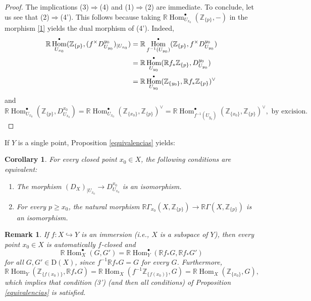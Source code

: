 \documentclass[amssymb,amscd,11pt,20pt]{amsart}
\newcommand{\ZZ}{{\mathbb Z}}
\newcommand{\RR}{\mathbb R}
\newcommand{\0}{\mathbf 0}
\DeclareMathOperator{\Hom}{{Hom}}
\newcommand{\pun}{{\scriptscriptstyle \bullet}}
\theoremstyle{plain}
\newtheorem{cor}[thm]{Corollary}
\newtheorem{rem}[thm]{Remark}
\numberwithin{equation}{thm}
\begin{document}
\begin{proof}

The implications (3)$\Rightarrow$(4) and (1)$\Rightarrow$(2) are immediate. To conclude, let us see that (2)$\Rightarrow$(4'). This follows because   taking $\RR\Hom_{U_{x_0}}^\pun(\ZZ_{\{p\}},-)$ in the morphism \eqref{1} yields the dual morphism of (4'). Indeed,
 \[ \aligned  \RR\Hom_{U_{x_0}}^\pun(\ZZ_{\{p\}}, (f^\times D_{U_{y_0}}^{y_0})_{\vert U_{x_0}}) &= 
 \RR\Hom_{f^{-1}(U_{y_0})}^\pun(\ZZ_{\{p\}}, f^\times D_{U_{y_0}}^{y_0}) 
 \\ &=  \RR\Hom_{U_{y_0}}^\pun(\RR f_* \ZZ_{\{p\}},  D_{U_{y_0}}^{y_0}) 
 \\ &= \RR\Hom_{U_{y_0}}^\pun (\ZZ_{\{y_0\}}, \RR f_* \ZZ_{\{p\}})^\vee
 \endaligned\]
 and 
 \[ \RR\Hom_{U_{x_0}}^\pun(\ZZ_{\{p\}}, D_{U_{x_0}}^{x_0}) = \RR\Hom_{U_{x_0}}^\pun (\ZZ_{\{x_0\}}, \ZZ_{\{p\}})^\vee  =  \RR\Hom_{f^{-1}(U_{y_0})}^\pun (\ZZ_{\{x_0\}}, \ZZ_{\{p\}})^\vee, \text{ by excision}.
 \]
\end{proof}


If $Y$ is a single point, Proposition \ref{equivalencias} yields:
\begin{cor}\label{properspace}  For every closed point  $x_0\in X$, the following conditions are equivalent:
\begin{enumerate}
\item The morphism $ (D_X)_{\vert U_{x_0}}\to D_{U_{x_0}}^{x_0}$ is an isomorphism.
\item For every $p\geq x_0$, the natural morphism $\RR\Gamma_{x_0}(X,\ZZ_{\{p\}})\to \RR\Gamma(X,\ZZ_{\{p\}})$ is an isomorphism.
\end{enumerate}

 
\end{cor}



\begin{rem}\label{immersion} {\rm If $f\colon X\hookrightarrow Y$ is an immersion (i.e., $X$ is a subspace of $Y$), then every point $x_0\in X$ is automatically $f$-closed and
\[ \RR\Hom_X^\pun(G,G')=\RR\Hom_Y^\pun(\RR f_*G, \RR f_*G')\] for all $G,G'\in \mathrm{D}(X)$, since $f^{-1}\RR f_*G=G$ for every $G$. Furthermore, 
$$\RR\Hom_Y(\ZZ_{\{f(x_0)\}}, \RR f_*G)= \RR\Hom_X(f^{-1}\ZZ_{\{f(x_0)\}},  G) = \RR\Hom_X( \ZZ_{\{ x_0\}},  G) ,$$  which implies that  condition (3') (and then all conditions) of Proposition \ref{equivalencias} is satisfied.}
\end{rem}
\end{document}
